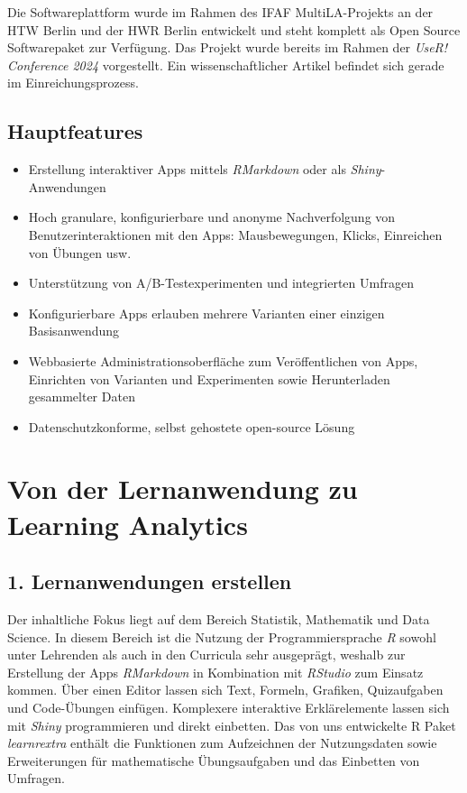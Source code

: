 \documentclass[a0,portrait]{a0poster}
\begin{document}
\begin{multicols}{2}
Die Softwareplattform wurde im Rahmen des IFAF MultiLA-Projekts an der HTW Berlin und der HWR Berlin entwickelt und steht komplett als Open Source Softwarepaket zur Verfügung. Das Projekt wurde bereits im Rahmen der \textit{UseR! Conference 2024} \cite{userconf24} vorgestellt. Ein wissenschaftlicher Artikel befindet sich gerade im Einreichungsprozess.

\subsection*{Hauptfeatures}

\begin{itemize}
    \item Erstellung interaktiver Apps mittels \textit{RMarkdown} oder als \textit{Shiny}-Anwendungen
    \item Hoch granulare, konfigurierbare und anonyme Nachverfolgung von Benutzerinteraktionen mit den Apps: Mausbewegungen, Klicks, Einreichen von Übungen usw.
    \item Unterstützung von A/B-Testexperimenten und integrierten Umfragen
    \item Konfigurierbare Apps erlauben mehrere Varianten einer einzigen Basisanwendung
    \item Webbasierte Administrationsoberfläche zum Veröffentlichen von Apps, Einrichten von Varianten und Experimenten sowie Herunterladen gesammelter Daten
    \item Datenschutzkonforme, selbst gehostete open-source Lösung
\end{itemize}

\section*{Von der Lernanwendung zu Learning Analytics}

\subsection*{1. Lernanwendungen erstellen}

Der inhaltliche Fokus liegt auf dem Bereich Statistik, Mathematik und Data Science. In diesem Bereich ist die Nutzung der Programmiersprache \textit{R} sowohl unter Lehrenden als auch in den Curricula sehr ausgeprägt, weshalb zur Erstellung der Apps \textit{RMarkdown} in Kombination mit \textit{RStudio} zum Einsatz kommen. Über einen Editor lassen sich Text, Formeln, Grafiken, Quizaufgaben und Code-Übungen einfügen. Komplexere interaktive Erklärelemente lassen sich mit \textit{Shiny} programmieren und direkt einbetten. Das von uns entwickelte R Paket \textit{learnrextra} \cite{konrad_ifafmultilalearnrextra_2024} enthält die Funktionen zum Aufzeichnen der Nutzungsdaten sowie Erweiterungen für mathematische Übungsaufgaben und das Einbetten von Umfragen.


\end{multicols}
\end{document}
